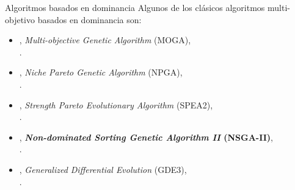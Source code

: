 \documentclass{beamer}
\begin{document}
\begin{frame}{Algoritmos basados en dominancia}
Algunos de los clásicos algoritmos multi-objetivo basados en dominancia son:
\begin{itemize}
\scriptsize
    \item \citeyear{Joel:MOGA}, \textit{Multi-objective Genetic Algorithm} (MOGA), \\ \citeauthor{Joel:MOGA}.
    \item \citeyear{Joel:NPGA}, \textit{Niche Pareto Genetic Algorithm} (NPGA), \\ \citeauthor{Joel:NPGA}.
    \item \citeyear{zitzler2001spea2}, \textit{Strength Pareto Evolutionary Algorithm} (SPEA2), \\ \citeauthor{zitzler2001spea2}.
    \item \citeyear{Joel:NSGAII},  \textbf{\textit{Non-dominated Sorting Genetic Algorithm II} (NSGA-II)}, \\ \citeauthor{Joel:NSGAII}.
    \item \citeyear{Joel:GDE3}, \textit{Generalized Differential Evolution} (GDE3), \\ \citeauthor{Joel:GDE3}.
\end{itemize}
\end{frame}
\end{document}
